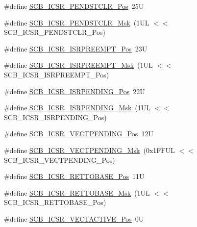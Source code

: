 \begin{DoxyCompactItemize}
\item 
\#define \hyperlink{group___c_m_s_i_s___s_c_b_gadbe25e4b333ece1341beb1a740168fdc}{S\+C\+B\+\_\+\+I\+C\+S\+R\+\_\+\+P\+E\+N\+D\+S\+T\+C\+L\+R\+\_\+\+Pos}~25U
\item 
\#define \hyperlink{group___c_m_s_i_s___s_c_b_gab241827d2a793269d8cd99b9b28c2157}{S\+C\+B\+\_\+\+I\+C\+S\+R\+\_\+\+P\+E\+N\+D\+S\+T\+C\+L\+R\+\_\+\+Msk}~(1\+U\+L $<$$<$ S\+C\+B\+\_\+\+I\+C\+S\+R\+\_\+\+P\+E\+N\+D\+S\+T\+C\+L\+R\+\_\+\+Pos)
\item 
\#define \hyperlink{group___c_m_s_i_s___s_c_b_ga11cb5b1f9ce167b81f31787a77e575df}{S\+C\+B\+\_\+\+I\+C\+S\+R\+\_\+\+I\+S\+R\+P\+R\+E\+E\+M\+P\+T\+\_\+\+Pos}~23U
\item 
\#define \hyperlink{group___c_m_s_i_s___s_c_b_gaa966600396290808d596fe96e92ca2b5}{S\+C\+B\+\_\+\+I\+C\+S\+R\+\_\+\+I\+S\+R\+P\+R\+E\+E\+M\+P\+T\+\_\+\+Msk}~(1\+U\+L $<$$<$ S\+C\+B\+\_\+\+I\+C\+S\+R\+\_\+\+I\+S\+R\+P\+R\+E\+E\+M\+P\+T\+\_\+\+Pos)
\item 
\#define \hyperlink{group___c_m_s_i_s___s_c_b_ga10749d92b9b744094b845c2eb46d4319}{S\+C\+B\+\_\+\+I\+C\+S\+R\+\_\+\+I\+S\+R\+P\+E\+N\+D\+I\+N\+G\+\_\+\+Pos}~22U
\item 
\#define \hyperlink{group___c_m_s_i_s___s_c_b_ga056d74fd538e5d36d3be1f28d399c877}{S\+C\+B\+\_\+\+I\+C\+S\+R\+\_\+\+I\+S\+R\+P\+E\+N\+D\+I\+N\+G\+\_\+\+Msk}~(1\+U\+L $<$$<$ S\+C\+B\+\_\+\+I\+C\+S\+R\+\_\+\+I\+S\+R\+P\+E\+N\+D\+I\+N\+G\+\_\+\+Pos)
\item 
\#define \hyperlink{group___c_m_s_i_s___s_c_b_gada60c92bf88d6fd21a8f49efa4a127b8}{S\+C\+B\+\_\+\+I\+C\+S\+R\+\_\+\+V\+E\+C\+T\+P\+E\+N\+D\+I\+N\+G\+\_\+\+Pos}~12U
\item 
\#define \hyperlink{group___c_m_s_i_s___s_c_b_gacb6992e7c7ddc27a370f62878a21ef72}{S\+C\+B\+\_\+\+I\+C\+S\+R\+\_\+\+V\+E\+C\+T\+P\+E\+N\+D\+I\+N\+G\+\_\+\+Msk}~(0x1\+F\+F\+U\+L $<$$<$ S\+C\+B\+\_\+\+I\+C\+S\+R\+\_\+\+V\+E\+C\+T\+P\+E\+N\+D\+I\+N\+G\+\_\+\+Pos)
\item 
\#define \hyperlink{group___c_m_s_i_s___s_c_b_ga403d154200242629e6d2764bfc12a7ec}{S\+C\+B\+\_\+\+I\+C\+S\+R\+\_\+\+R\+E\+T\+T\+O\+B\+A\+S\+E\+\_\+\+Pos}~11U
\item 
\#define \hyperlink{group___c_m_s_i_s___s_c_b_gaca6fc3f79bb550f64fd7df782ed4a5f6}{S\+C\+B\+\_\+\+I\+C\+S\+R\+\_\+\+R\+E\+T\+T\+O\+B\+A\+S\+E\+\_\+\+Msk}~(1\+U\+L $<$$<$ S\+C\+B\+\_\+\+I\+C\+S\+R\+\_\+\+R\+E\+T\+T\+O\+B\+A\+S\+E\+\_\+\+Pos)
\item 
\#define \hyperlink{group___c_m_s_i_s___s_c_b_gae4f602c7c5c895d5fb687b71b0979fc3}{S\+C\+B\+\_\+\+I\+C\+S\+R\+\_\+\+V\+E\+C\+T\+A\+C\+T\+I\+V\+E\+\_\+\+Pos}~0U
$$
\end{DoxyCompactItemize}
